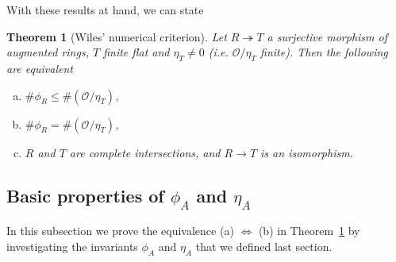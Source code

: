 \documentclass{article}
\theoremstyle{plain}%
\newtheorem{theorem}{Theorem}[section]
\theoremstyle{definition}
\theoremstyle{remark}
\begin{document}
    With these results at hand, we can state 
    \begin{theorem}[Wiles' numerical criterion]\label{thm:wiles_numerical_criterion}
        Let \(R \twoheadrightarrow T\) a surjective morphism of augmented rings, \(T\) finite flat and \(\eta_T \neq 0\) 
        (i.e. \(\mathcal{O}/\eta_T\) finite).
        Then the following are equivalent
        \begin{enumerate}[(a)]
            \item \(\# \phi_R \le \#(\mathcal{O}/\eta_T)\),
            \item \(\# \phi_R = \#(\mathcal{O}/\eta_T)\),
            \item \(R\) and \(T\) are complete intersections, and \(R \to T\) is an isomorphism.
        \end{enumerate}
    \end{theorem}

    \subsection{Basic properties of \(\phi_A\) and \(\eta_A\)}
    In this subsection we prove the equivalence (a) \(\Leftrightarrow\) (b) in Theorem~\ref{thm:wiles_numerical_criterion}
    by investigating the invariants \(\phi_A\) and \(\eta_A\) that we defined last section.
\end{document}
